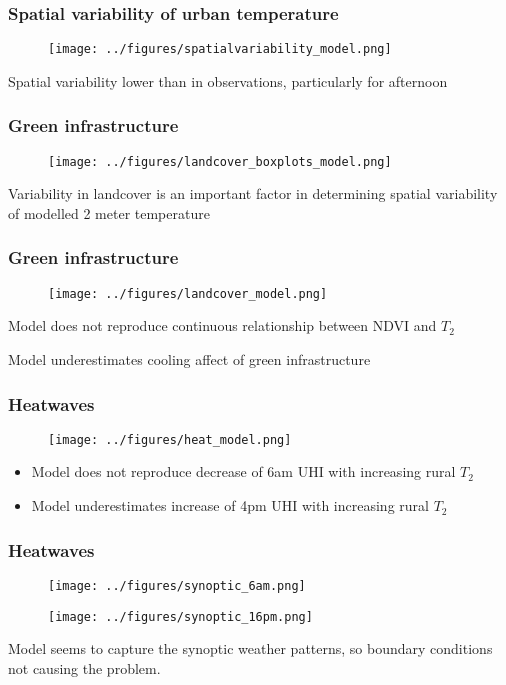 \documentclass[aspectratio=169, 10pt]{beamer}
\begin{document}
\begin{frame}
\frametitle{Spatial variability of urban temperature}
\begin{figure}
\texttt{[image: ../figures/spatialvariability\_model.png]}
\end{figure}
Spatial variability lower than in observations, particularly for afternoon
\end{frame}

\begin{frame}
\frametitle{Green infrastructure}
\begin{figure}
\texttt{[image: ../figures/landcover\_boxplots\_model.png]}
\end{figure}
Variability in landcover is an important factor in determining spatial variability of modelled 2 meter temperature
\end{frame}

\begin{frame}
\frametitle{Green infrastructure}
\begin{figure}
\texttt{[image: ../figures/landcover\_model.png]}
\end{figure}
\item Model does not reproduce continuous relationship between NDVI and $T_2$
\item Model underestimates cooling affect of green infrastructure
\end{frame}

\begin{frame}
\frametitle{Heatwaves}
\begin{figure}
\texttt{[image: ../figures/heat\_model.png]}
\end{figure}
\begin{itemize}
\item Model does not reproduce decrease of 6am UHI with increasing rural $T_2$
\item Model underestimates increase of 4pm UHI with increasing rural $T_2$
\end{itemize}
\end{frame}


\begin{frame}
\frametitle{Heatwaves}
\begin{figure}
\texttt{[image: ../figures/synoptic\_6am.png]}

\texttt{[image: ../figures/synoptic\_16pm.png]}
\end{figure}
Model seems to capture the synoptic weather patterns, so boundary conditions not causing the problem. 
\end{frame}
\end{document}
